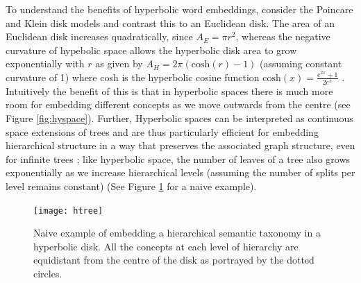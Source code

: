 \documentclass[12pt]{report}
\begin{document}
To understand the benefits of hyperbolic word embeddings, consider the Poincare and Klein disk models and contrast this to an Euclidean disk. The area of an Euclidean disk increases quadratically, since $A_E=\pi r^2$, whereas the negative curvature of hypebolic space allows the hyperbolic disk area to grow exponentially with $r$ as given by $A_H=2 \pi \left(\text{cosh}(r) - 1 \right)$ (assuming constant curvature of 1) where cosh is the hyperbolic cosine function $\text{cosh}(x)=\frac{e^{2x} + 1}{2e^x}$ \cite{Greenberg1994}. Intuitively the benefit of this is that in hyperbolic spaces there is much more room for embedding different concepts as we move outwards from the centre (see Figure \ref{fig:hyspace}). Further, Hyperbolic spaces can be interpreted as continuous space extensions of trees and are thus particularly efficient for embedding hierarchical structure in a way that preserves the associated graph structure, even for infinite trees \cite{Chamberlain2017}; like hyperbolic space, the number of leaves of a tree also grows exponentially as we increase hierarchical levels (assuming the number of splits per level remains constant) \cite{Nickel2017} (See Figure \ref{fig:htree} for a naive example). 

\begin{figure}
  \centering
  \texttt{[image: htree]}
	\caption{Naive example of embedding a hierarchical semantic taxonomy in a hyperbolic disk. All the concepts at each level of hierarchy are equidistant from the centre of the disk as portrayed by the dotted circles.}
  \label{fig:htree}
\end{figure}
\end{document}
